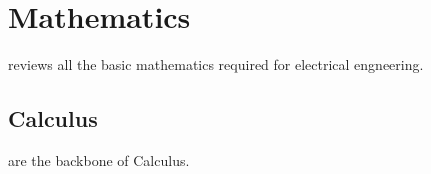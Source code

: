 \cleardoublepage
\chapter{Mathematics}
\label{ch:math}

 reviews all the basic mathematics required for electrical engneering. 


\mainmatter

\section{Calculus}
 are the backbone of Calculus.
